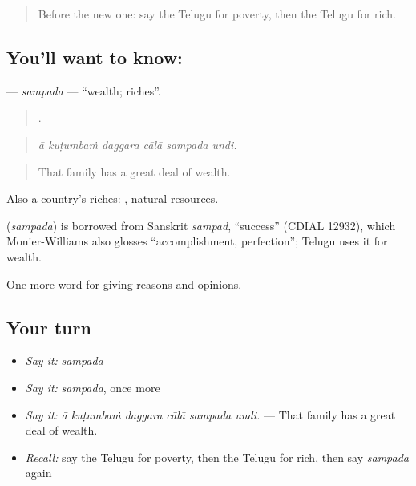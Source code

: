 \label{lesson:TE-C404-sampada}



\begin{quote}
Before the new one: say the Telugu for poverty, then the Telugu for rich.
\end{quote}

\subsection*{You'll want to know: }
\textbf{} — \emph{sampada} — \textquotedblleft{}wealth; riches\textquotedblright{}.

\begin{quote}
     .
\end{quote}

\begin{quote}
\emph{ā kuṭumbaṁ daggara cālā sampada undi.}
\end{quote}

\begin{quote}
That family has a great deal of wealth.
\end{quote}

Also a country’s riches:  , natural resources.

\begin{cousinweb}
\textbf{} (\emph{sampada}) is borrowed from Sanskrit \emph{sampad}, \textquotedblleft{}success\textquotedblright{} (CDIAL 12932), which Monier-Williams also glosses \textquotedblleft{}accomplishment, perfection\textquotedblright{}; Telugu uses it for wealth.
\end{cousinweb}

\begin{grammarlens}[title={What you've built}]
One more word for giving reasons and opinions.
\end{grammarlens}

\subsection*{Your turn}
\begin{itemize}
\raggedright
  \item \emph{Say it:} \emph{sampada}
  \item \emph{Say it:} \emph{sampada}, once more
  \item \emph{Say it:} \emph{ā kuṭumbaṁ daggara cālā sampada undi.} — That family has a great deal of wealth.
  \item \emph{Recall:} say the Telugu for poverty, then the Telugu for rich, then say \emph{sampada} again
\end{itemize}

